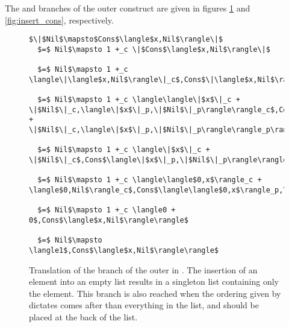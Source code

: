 %
%
%
%
%
%
%
The  and  branches of the outer  construct are given in
figures \ref{fig:insert_nil} and \ref{fig:insert_cons}, respectively.
%
\begin{figure}[H]
\caption{Translation of the  branch of the outer  in .
The insertion of an element into an empty list results in a singleton list containing only the element.
This branch is also reached when the ordering given by  dictates  comes after than everything in the list,
  and should be placed at the back of the list.
}
\label{fig:insert_nil}
\begin{lstlisting}
$\|$Nil$\mapsto$Cons$\langle$x,Nil$\rangle\|$
  $=$ Nil$\mapsto 1 +_c \|$Cons$\langle$x,Nil$\rangle\|$

  $=$ Nil$\mapsto 1 +_c \langle\|\langle$x,Nil$\rangle\|_c$,Cons$\|\langle$x,Nil$\rangle\|_p\rangle$

  $=$ Nil$\mapsto 1 +_c \langle\langle\|$x$\|_c + \|$Nil$\|_c,\langle\|$x$\|_p,\|$Nil$\|_p\rangle\rangle_c$,Cons$\langle\|$x$\|_c + \|$Nil$\|_c,\langle\|$x$\|_p,\|$Nil$\|_p\rangle\rangle_p\rangle$

  $=$ Nil$\mapsto 1 +_c \langle\|$x$\|_c + \|$Nil$\|_c$,Cons$\langle\|$x$\|_p,\|$Nil$\|_p\rangle\rangle$

  $=$ Nil$\mapsto 1 +_c \langle\langle$0,x$\rangle_c + \langle$0,Nil$\rangle_c$,Cons$\langle\langle$0,x$\rangle_p,\langle$0,Nil$\rangle_p\rangle\rangle$

  $=$ Nil$\mapsto 1 +_c \langle0 + 0$,Cons$\langle$x,Nil$\rangle\rangle$

  $=$ Nil$\mapsto \langle1$,Cons$\langle$x,Nil$\rangle\rangle$
\end{lstlisting}
\end{figure}
%
